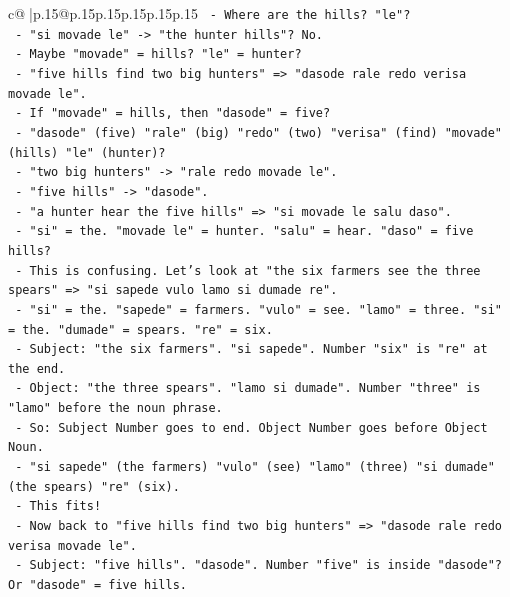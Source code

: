 \documentclass{article}
\begin{document}
{\begin{supertabular}{c@{$\;$}|p{.15\linewidth}@{}p{.15\linewidth}p{.15\linewidth}p{.15\linewidth}p{.15\linewidth}p{.15\linewidth}}
{{{\texttt{              {-} Where are the hills? "le"?} \\
\texttt{              {-} "si movade le" {-}> "the hunter hills"? No.} \\
\texttt{              {-} Maybe "movade" = hills? "le" = hunter?} \\
\texttt{              {-} "five hills find two big hunters" => "dasode rale redo verisa movade le".} \\
\texttt{              {-} If "movade" = hills, then "dasode" = five?} \\
\texttt{              {-} "dasode" (five) "rale" (big) "redo" (two) "verisa" (find) "movade" (hills) "le" (hunter)?} \\
\texttt{              {-} "two big hunters" {-}> "rale redo movade le".} \\
\texttt{              {-} "five hills" {-}> "dasode".} \\
\texttt{              {-} "a hunter hear the five hills" => "si movade le salu daso".} \\
\texttt{              {-} "si" = the. "movade le" = hunter. "salu" = hear. "daso" = five hills?} \\
\texttt{              {-} This is confusing. Let's look at "the six farmers see the three spears" => "si sapede vulo lamo si dumade re".} \\
\texttt{                {-} "si" = the. "sapede" = farmers. "vulo" = see. "lamo" = three. "si" = the. "dumade" = spears. "re" = six.} \\
\texttt{                {-} Subject: "the six farmers". "si sapede". Number "six" is "re" at the end.} \\
\texttt{                {-} Object: "the three spears". "lamo si dumade". Number "three" is "lamo" before the noun phrase.} \\
\texttt{                {-} So: Subject Number goes to end. Object Number goes before Object Noun.} \\
\texttt{                {-} "si sapede" (the farmers) "vulo" (see) "lamo" (three) "si dumade" (the spears) "re" (six).} \\
\texttt{                {-} This fits!} \\
\texttt{                {-} Now back to "five hills find two big hunters" => "dasode rale redo verisa movade le".} \\
\texttt{                  {-} Subject: "five hills". "dasode". Number "five" is inside "dasode"? Or "dasode" = five hills.} \\
}}}
\end{supertabular}}
\end{document}
